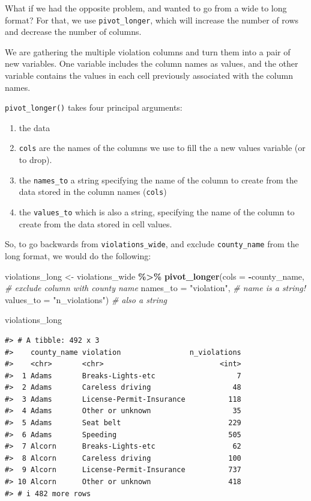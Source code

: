 \documentclass[
]{book}
\newenvironment{Shaded}{\begin{snugshade}}{\end{snugshade}}
\newcommand{\AttributeTok}[1]{\textcolor[rgb]{0.13,0.29,0.53}{#1}}
\newcommand{\CommentTok}[1]{\textcolor[rgb]{0.56,0.35,0.01}{\textit{#1}}}
\newcommand{\FunctionTok}[1]{\textcolor[rgb]{0.13,0.29,0.53}{\textbf{#1}}}
\newcommand{\NormalTok}[1]{#1}
\newcommand{\OtherTok}[1]{\textcolor[rgb]{0.56,0.35,0.01}{#1}}
\newcommand{\SpecialCharTok}[1]{\textcolor[rgb]{0.81,0.36,0.00}{\textbf{#1}}}
\newcommand{\StringTok}[1]{\textcolor[rgb]{0.31,0.60,0.02}{#1}}
\providecommand{\tightlist}{%
  \setlength{\itemsep}{0pt}\setlength{\parskip}{0pt}}
\begin{document}
What if we had the opposite problem, and wanted to go from a wide to long
format? For that, we use \texttt{pivot\_longer}, which will increase the number of rows and decrease the number of columns.

We are gathering the multiple violation columns and turn them into a pair of new variables. One variable includes the column names as values, and the other variable contains the values in each cell previously associated with the column names.

\texttt{pivot\_longer()} takes four principal arguments:

\begin{enumerate}
\def\labelenumi{\arabic{enumi}.}
\tightlist
\item
  the data
\item
  \texttt{cols} are the names of the columns we use to fill the a new values variable (or to drop).
\item
  the \texttt{names\_to} a string specifying the name of the column to create from the data stored in the column names (\texttt{cols})
\item
  the \texttt{values\_to} which is also a string, specifying the name of the column to create from the data stored in cell values.
\end{enumerate}

So, to go backwards from \texttt{violations\_wide}, and exclude \texttt{county\_name} from the long format, we would do the following:

\begin{Shaded}
\begin{Highlighting}[]
\NormalTok{violations\_long }\OtherTok{\textless{}{-}}\NormalTok{ violations\_wide }\SpecialCharTok{\%\textgreater{}\%}
  \FunctionTok{pivot\_longer}\NormalTok{(}\AttributeTok{cols =} \SpecialCharTok{{-}}\NormalTok{county\_name,        }\CommentTok{\# exclude column with county name}
               \AttributeTok{names\_to =} \StringTok{"violation"}\NormalTok{,     }\CommentTok{\# name is a string!}
               \AttributeTok{values\_to =} \StringTok{"n\_violations"}\NormalTok{)            }\CommentTok{\# also a string}

\NormalTok{violations\_long}
\end{Highlighting}
\end{Shaded}

\begin{verbatim}
#> # A tibble: 492 x 3
#>    county_name violation                n_violations
#>    <chr>       <chr>                           <int>
#>  1 Adams       Breaks-Lights-etc                   7
#>  2 Adams       Careless driving                   48
#>  3 Adams       License-Permit-Insurance          118
#>  4 Adams       Other or unknown                   35
#>  5 Adams       Seat belt                         229
#>  6 Adams       Speeding                          505
#>  7 Alcorn      Breaks-Lights-etc                  62
#>  8 Alcorn      Careless driving                  100
#>  9 Alcorn      License-Permit-Insurance          737
#> 10 Alcorn      Other or unknown                  418
#> # i 482 more rows
\end{verbatim}
\end{document}
